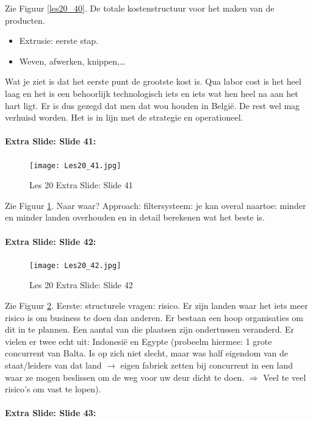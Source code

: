 \documentclass[10pt,a4paper]{report}
\begin{document}
Zie Figuur \ref{les20_40}. De totale kostenstructuur voor het maken van de producten.
\begin{itemize}
\item Extrusie: eerste stap.
\item Weven, afwerken, knippen,…
\end{itemize}
Wat je ziet is dat het eerste punt de grootste kost is. Qua labor cost is het heel laag en het is een behoorlijk technologisch iets en iets wat hen heel na aan het hart ligt. Er is dus gezegd dat men dat wou houden in Belgi\"e. De rest wel mag verhuisd worden. Het is in lijn met de strategie en operationeel.

\paragraph{Extra Slide: Slide 41:}

\begin{figure}[h!]
\centering
\texttt{[image: Les20\_41.jpg]}
\caption{Les 20 Extra Slide: Slide 41} 
\label{les20_41}
\end{figure}

Zie Figuur \ref{les20_41}. Naar waar? Approach: filtersysteem: je kan overal naartoe: minder en minder landen overhouden en in detail berekenen wat het beste is.

\paragraph{Extra Slide: Slide 42:}

\begin{figure}[h!]
\centering
\texttt{[image: Les20\_42.jpg]}
\caption{Les 20 Extra Slide: Slide 42} 
\label{les20_42}
\end{figure}

Zie Figuur \ref{les20_42}. Eerste: structurele vragen: risico. Er zijn landen waar het iets meer risico is om business te doen dan anderen. Er bestaan een hoop organisaties om dit in te plannen. Een aantal van die plaatsen zijn ondertussen veranderd. Er vielen er twee echt uit: Indonesi\"e en Egypte (probeelm hiermee: 1 grote concurrent van Balta. Is op zich niet slecht, maar was half eigendom van de staat/leiders van dat land $\rightarrow$ eigen fabriek zetten bij concurrent in een land waar ze mogen beslissen om de weg voor uw deur dicht te doen. $\Rightarrow$ Veel te veel risico's om vast te lopen).

\paragraph{Extra Slide: Slide 43:}
\end{document}
